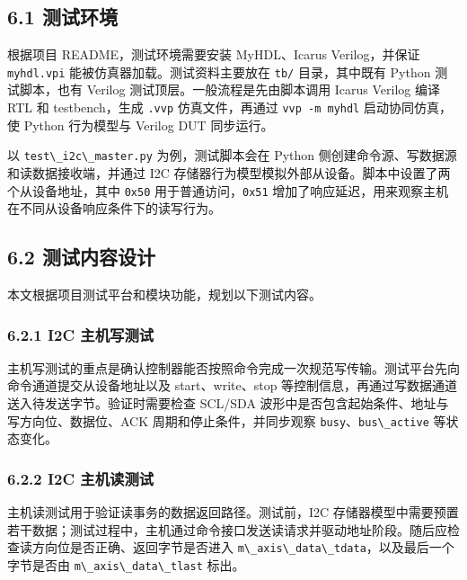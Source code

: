 \subsection{6.1 测试环境}\label{ux6d4bux8bd5ux73afux5883}

根据项目 README，测试环境需要安装 MyHDL、Icarus Verilog，并保证
\passthrough{\lstinline!myhdl.vpi!} 能被仿真器加载。测试资料主要放在
\passthrough{\lstinline!tb/!} 目录，其中既有 Python 测试脚本，也有
Verilog 测试顶层。一般流程是先由脚本调用 Icarus Verilog 编译 RTL 和
testbench，生成 \passthrough{\lstinline!.vvp!} 仿真文件，再通过
\passthrough{\lstinline!vvp -m myhdl!} 启动协同仿真，使 Python
行为模型与 Verilog DUT 同步运行。

以 \passthrough{\lstinline!test\_i2c\_master.py!} 为例，测试脚本会在
Python 侧创建命令源、写数据源和读数据接收端，并通过 I2C
存储器行为模型模拟外部从设备。脚本中设置了两个从设备地址，其中
\passthrough{\lstinline!0x50!}
用于普通访问，\passthrough{\lstinline!0x51!}
增加了响应延迟，用来观察主机在不同从设备响应条件下的读写行为。

\subsection{6.2
测试内容设计}\label{ux6d4bux8bd5ux5185ux5bb9ux8bbeux8ba1}

本文根据项目测试平台和模块功能，规划以下测试内容。

\subsubsection{6.2.1 I2C
主机写测试}\label{i2c-ux4e3bux673aux5199ux6d4bux8bd5}

主机写测试的重点是确认控制器能否按照命令完成一次规范写传输。测试平台先向命令通道提交从设备地址以及
start、write、stop
等控制信息，再通过写数据通道送入待发送字节。验证时需要检查 SCL/SDA
波形中是否包含起始条件、地址与写方向位、数据位、ACK
周期和停止条件，并同步观察
\passthrough{\lstinline!busy!}、\passthrough{\lstinline!bus\_active!}
等状态变化。

\subsubsection{6.2.2 I2C
主机读测试}\label{i2c-ux4e3bux673aux8bfbux6d4bux8bd5}

主机读测试用于验证读事务的数据返回路径。测试前，I2C
存储器模型中需要预置若干数据；测试过程中，主机通过命令接口发送读请求并驱动地址阶段。随后应检查读方向位是否正确、返回字节是否进入
\passthrough{\lstinline!m\_axis\_data\_tdata!}，以及最后一个字节是否由
\passthrough{\lstinline!m\_axis\_data\_tlast!} 标出。

